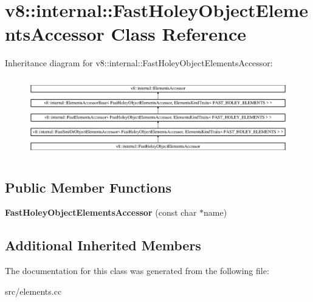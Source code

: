 \hypertarget{classv8_1_1internal_1_1_fast_holey_object_elements_accessor}{}\section{v8\+:\+:internal\+:\+:Fast\+Holey\+Object\+Elements\+Accessor Class Reference}
\label{classv8_1_1internal_1_1_fast_holey_object_elements_accessor}
Inheritance diagram for v8\+:\+:internal\+:\+:Fast\+Holey\+Object\+Elements\+Accessor\+:\begin{figure}[H]
\begin{center}
\leavevmode
\includegraphics[height=3.482587cm]{classv8_1_1internal_1_1_fast_holey_object_elements_accessor}
\end{center}
\end{figure}
\subsection*{Public Member Functions}
\begin{DoxyCompactItemize}
\item 
\hypertarget{classv8_1_1internal_1_1_fast_holey_object_elements_accessor_abd564867e95afe846ce5b8142f255627}{}{\bfseries Fast\+Holey\+Object\+Elements\+Accessor} (const char $\ast$name)\label{classv8_1_1internal_1_1_fast_holey_object_elements_accessor_abd564867e95afe846ce5b8142f255627}

\end{DoxyCompactItemize}
\subsection*{Additional Inherited Members}


The documentation for this class was generated from the following file\+:\begin{DoxyCompactItemize}
\item 
src/elements.\+cc\end{DoxyCompactItemize}
